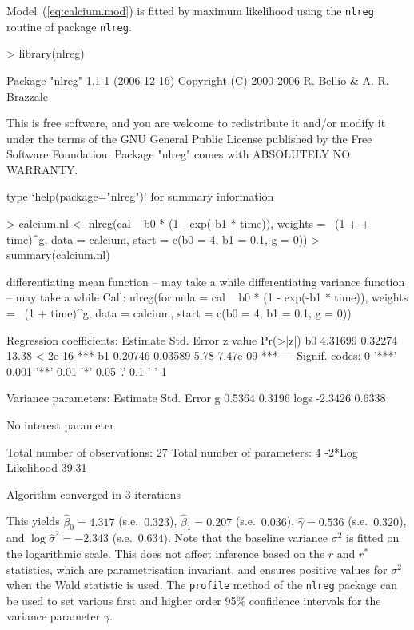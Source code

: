\documentclass[a4paper,11pt]{article}
\def\code{\texttt}
\begin{document}
Model~(\ref{eq:calcium.mod}) is fitted by maximum likelihood using the \code{nlreg} routine of package \code{nlreg}.
%
\begin{Schunk}
\begin{Sinput}
> library(nlreg)
\end{Sinput}
\begin{Soutput}
   Package "nlreg" 1.1-1 (2006-12-16) 
   Copyright (C) 2000-2006 R. Bellio & A. R. Brazzale

This is free software, and you are welcome to redistribute
it and/or modify it under the terms of the GNU General
Public License published by the Free Software Foundation.
Package "nlreg" comes with ABSOLUTELY NO WARRANTY.

type `help(package="nlreg")' for summary information
\end{Soutput}
\begin{Sinput}
> calcium.nl <- nlreg(cal ~ b0 * (1 - exp(-b1 * time)), weights = ~(1 + 
+     time)^g, data = calcium, start = c(b0 = 4, b1 = 0.1, g = 0))
> summary(calcium.nl)
\end{Sinput}
\begin{Soutput}
differentiating mean function -- may take a while
differentiating variance function -- may take a while
Call: 
nlreg(formula = cal ~ b0 * (1 - exp(-b1 * time)), weights = ~(1 + 
    time)^g, data = calcium, start = c(b0 = 4, b1 = 0.1, g = 0))

Regression coefficients:
   Estimate Std. Error z value Pr(>|z|)    
b0  4.31699    0.32274   13.38  < 2e-16 ***
b1  0.20746    0.03589    5.78 7.47e-09 ***
---
Signif. codes:  0 '***' 0.001 '**' 0.01 '*' 0.05 '.' 0.1 ' ' 1 

Variance parameters:
     Estimate Std. Error
g      0.5364     0.3196
logs  -2.3426     0.6338

No interest parameter

Total number of observations: 27
Total number of parameters: 4
-2*Log Likelihood 39.31 

Algorithm converged in 3 iterations
\end{Soutput}
\end{Schunk}
%
This yields $\hat\beta_0 = 4.317$ (s.e.\ $0.323$), $\hat\beta_1 = 0.207$ (s.e.\ $0.036$), $\hat\gamma = 0.536$ (s.e.\ $0.320$), and $\log\hat\sigma^2 = -2.343$ (s.e.\ $0.634$).  Note that the baseline variance $\sigma^2$ is fitted on the logarithmic scale.  This does not affect inference based on the $r$ and $r^*$ statistics, which are parametrisation invariant, and ensures positive values for $\sigma^2$ when the Wald statistic is used.  The \code{profile} method of the \code{nlreg} package can be used to set various first and higher order 95\% confidence intervals for the variance parameter $\gamma$.
\end{document}
